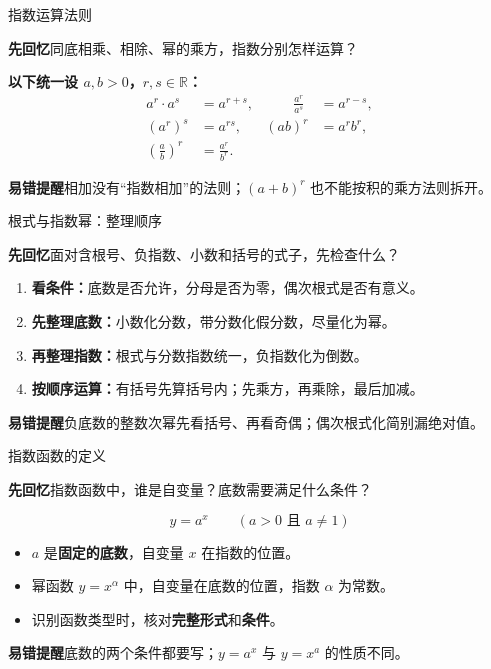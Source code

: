 \documentclass[UTF8,10pt,aspectratio=169,handout]{ctexbeamer}
\newcommand{\Recall}[1]{\par\noindent\textcolor{KnowledgeBlue}{\textbf{先回忆}\quad #1}\par\vspace{0.3cm}}
\newcommand{\Pitfall}[1]{\par\vspace{0.22cm}\noindent\textbf{易错提醒}\quad #1\par}
\begin{document}
\begin{frame}[t]{指数运算法则}
\Recall{同底相乘、相除、幂的乘方，指数分别怎样运算？}
\pause
\textbf{以下统一设 $a,b>0$，$r,s\in\mathbb R$：}
\[
\begin{aligned}
a^r\cdot a^s&=a^{r+s},&\qquad \frac{a^r}{a^s}&=a^{r-s},\\[0.35em]
(a^r)^s&=a^{rs},&(ab)^r&=a^rb^r,\\[0.35em]
\left(\frac ab\right)^r&=\frac{a^r}{b^r}.&&
\end{aligned}
\]
\Pitfall{相加没有“指数相加”的法则；$(a+b)^r$ 也不能按积的乘方法则拆开。}
\end{frame}

\begin{frame}[t]{根式与指数幂：整理顺序}
\Recall{面对含根号、负指数、小数和括号的式子，先检查什么？}
\pause
\begin{enumerate}
\item \textbf{看条件：}底数是否允许，分母是否为零，偶次根式是否有意义。
\item \textbf{先整理底数：}小数化分数，带分数化假分数，尽量化为幂。
\item \textbf{再整理指数：}根式与分数指数统一，负指数化为倒数。
\item \textbf{按顺序运算：}有括号先算括号内；先乘方，再乘除，最后加减。
\end{enumerate}
\Pitfall{负底数的整数次幂先看括号、再看奇偶；偶次根式化简别漏绝对值。}
\end{frame}

\begin{frame}[t]{指数函数的定义}
\Recall{指数函数中，谁是自变量？底数需要满足什么条件？}
\pause
\[
\boxed{y=a^x\qquad (a>0\text{ 且 }a\ne1)}
\]
\begin{itemize}
\item $a$ 是\textbf{固定的底数}，自变量 $x$ 在指数的位置。
\item 幂函数 $y=x^\alpha$ 中，自变量在底数的位置，指数 $\alpha$ 为常数。
\item 识别函数类型时，核对\textbf{完整形式}和\textbf{条件}。
\end{itemize}
\Pitfall{底数的两个条件都要写；$y=a^x$ 与 $y=x^a$ 的性质不同。}
\end{frame}
\end{document}
